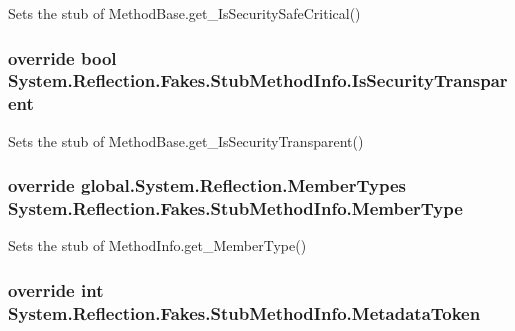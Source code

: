 Sets the stub of Method\-Base.\-get\-\_\-\-Is\-Security\-Safe\-Critical()

\hypertarget{class_system_1_1_reflection_1_1_fakes_1_1_stub_method_info_a72f80729eeeef2231e206327739ddc4a}{
\subsubsection[{Is\-Security\-Transparent}]{\setlength{\rightskip}{0pt plus 5cm}override bool System.\-Reflection.\-Fakes.\-Stub\-Method\-Info.\-Is\-Security\-Transparent\hspace{0.3cm}{\ttfamily [get]}}}\label{class_system_1_1_reflection_1_1_fakes_1_1_stub_method_info_a72f80729eeeef2231e206327739ddc4a}


Sets the stub of Method\-Base.\-get\-\_\-\-Is\-Security\-Transparent()

\hypertarget{class_system_1_1_reflection_1_1_fakes_1_1_stub_method_info_a25f0653e7f0e665138ce574ef8d59f46}{
\subsubsection[{Member\-Type}]{\setlength{\rightskip}{0pt plus 5cm}override global.\-System.\-Reflection.\-Member\-Types System.\-Reflection.\-Fakes.\-Stub\-Method\-Info.\-Member\-Type\hspace{0.3cm}{\ttfamily [get]}}}\label{class_system_1_1_reflection_1_1_fakes_1_1_stub_method_info_a25f0653e7f0e665138ce574ef8d59f46}


Sets the stub of Method\-Info.\-get\-\_\-\-Member\-Type()

\hypertarget{class_system_1_1_reflection_1_1_fakes_1_1_stub_method_info_a50f8e6f8b87d8f6d94e79b6e9a464258}{
\subsubsection[{Metadata\-Token}]{\setlength{\rightskip}{0pt plus 5cm}override int System.\-Reflection.\-Fakes.\-Stub\-Method\-Info.\-Metadata\-Token\hspace{0.3cm}{\ttfamily [get]}}}\label{class_system_1_1_reflection_1_1_fakes_1_1_stub_method_info_a50f8e6f8b87d8f6d94e79b6e9a464258}


